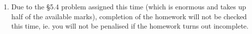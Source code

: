 \documentclass{amsart}
\theoremstyle{definition}
\theoremstyle{definition}
\DeclareMathOperator{\1}{\mathbbm{1}}
\begin{document}
	
	\begin{enumerate}[itemsep=.75em]
		
		
		\item Due to the \S5.4 problem assigned this time (which is enormous and takes up half of the available marks), completion of the homework will not be checked this time, ie. you will not be penalised if the homework turns out incomplete.
		
	
		
		

\end{enumerate}
\end{document}
